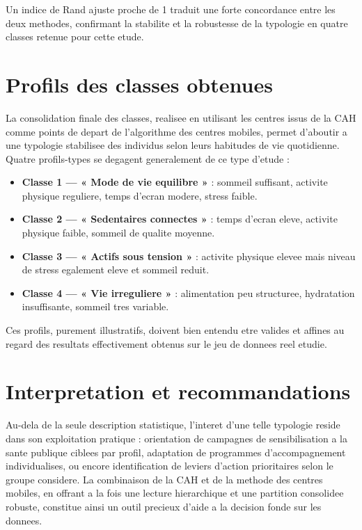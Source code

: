 \documentclass[12pt,a4paper]{book}
\begin{document}
	Un indice de Rand ajuste proche de 1 traduit une forte concordance entre les deux methodes, confirmant la stabilite et la robustesse de la typologie en quatre classes retenue pour cette etude.
	
	\section{Profils des classes obtenues}
	
	La consolidation finale des classes, realisee en utilisant les centres issus de la CAH comme points de depart de l'algorithme des centres mobiles, permet d'aboutir a une typologie stabilisee des individus selon leurs habitudes de vie quotidienne. Quatre profils-types se degagent generalement de ce type d'etude :
	
	\begin{itemize}
		\item \textbf{Classe 1 — « Mode de vie equilibre »} : sommeil suffisant, activite physique reguliere, temps d'ecran modere, stress faible.
		\item \textbf{Classe 2 — « Sedentaires connectes »} : temps d'ecran eleve, activite physique faible, sommeil de qualite moyenne.
		\item \textbf{Classe 3 — « Actifs sous tension »} : activite physique elevee mais niveau de stress egalement eleve et sommeil reduit.
		\item \textbf{Classe 4 — « Vie irreguliere »} : alimentation peu structuree, hydratation insuffisante, sommeil tres variable.
	\end{itemize}
	
	Ces profils, purement illustratifs, doivent bien entendu etre valides et affines au regard des resultats effectivement obtenus sur le jeu de donnees reel etudie.
	
	\section{Interpretation et recommandations}
	
	Au-dela de la seule description statistique, l'interet d'une telle typologie reside dans son exploitation pratique : orientation de campagnes de sensibilisation a la sante publique ciblees par profil, adaptation de programmes d'accompagnement individualises, ou encore identification de leviers d'action prioritaires selon le groupe considere. La combinaison de la CAH et de la methode des centres mobiles, en offrant a la fois une lecture hierarchique et une partition consolidee robuste, constitue ainsi un outil precieux d'aide a la decision fonde sur les donnees.
	
\end{document}
